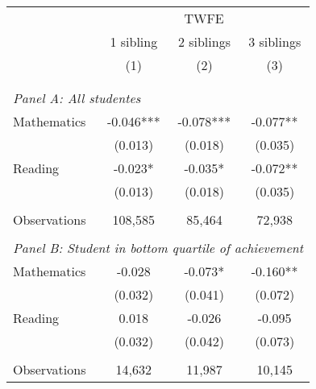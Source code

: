 \makeatletter
{}
{
\makeatother
\begin{tabular}{lccc}
\toprule
\cmidrule(lr){2-4}
& \multicolumn{3}{c}{TWFE} \\
\cmidrule(lr){2-4}
& 1 sibling & 2 siblings & 3 siblings  \\
\cmidrule(lr){2-2} \cmidrule(lr){3-3} \cmidrule(lr){4-4}
& (1) & (2) & (3)\\
\bottomrule
&  &  &  \\
&  &  &   \\
\multicolumn{4}{l}{\textit{Panel A: All studentes}} \\
\hspace{3mm}Mathematics&      -0.046***&      -0.078***&      -0.077** \\
                    &     (0.013)   &     (0.018)   &     (0.035)   \\
 
\hspace{3mm}Reading &      -0.023*  &      -0.035*  &      -0.072** \\
                    &     (0.013)   &     (0.018)   &     (0.035)   \\
                    &               &               &               \\
\hspace{3mm}Observations&     108,585   &      85,464   &      72,938   \\
 
&  &  &   \\
\multicolumn{4}{l}{\textit{Panel B: Student in bottom quartile of achievement}} \\
\hspace{3mm}Mathematics&      -0.028   &      -0.073*  &      -0.160** \\
                    &     (0.032)   &     (0.041)   &     (0.072)   \\
 
\hspace{3mm}Reading &       0.018   &      -0.026   &      -0.095   \\
                    &     (0.032)   &     (0.042)   &     (0.073)   \\
                    &               &               &               \\
\hspace{3mm}Observations&      14,632   &      11,987   &      10,145   \\
 

\end{tabular}}
